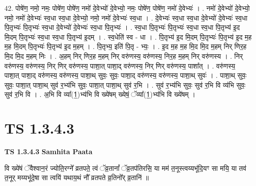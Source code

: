\documentclass[17pt]{extarticle}
\begin{document}
42. पोषे॑ण॒ नमो॒ नमः॒ पोषे॑ण॒ पोषे॑ण॒ नमो॑ दे॒वेभ्यो॑ दे॒वेभ्यो॒ नमः॒ पोषे॑ण॒ पोषे॑ण॒ नमो॑ दे॒वेभ्यः॑ । . नमो॑ दे॒वेभ्यो॑ दे॒वेभ्यो॒ नमो॒ नमो॑ दे॒वेभ्यः॑ स्व॒धा स्व॒धा दे॒वेभ्यो॒ नमो॒ नमो॑ दे॒वेभ्यः॑ स्व॒धा । . दे॒वेभ्यः॑ स्व॒धा स्व॒धा दे॒वेभ्यो॑ दे॒वेभ्यः॑ स्व॒धा पि॒तृभ्यः॑ पि॒तृभ्यः॑ स्व॒धा दे॒वेभ्यो॑ दे॒वेभ्यः॑ स्व॒धा पि॒तृभ्यः॑ । . स्व॒धा पि॒तृभ्यः॑ पि॒तृभ्यः॑ स्व॒धा स्व॒धा पि॒तृभ्य॑ इ॒द मि॒दम् पि॒तृभ्यः॑ स्व॒धा स्व॒धा पि॒तृभ्य॑ इ॒दम् । . स्व॒धेति॑ स्व - धा । . पि॒तृभ्य॑ इ॒द मि॒दम् पि॒तृभ्यः॑ पि॒तृभ्य॑ इ॒द म॒ह म॒ह मि॒दम् पि॒तृभ्यः॑ पि॒तृभ्य॑ इ॒द म॒हम् । . पि॒तृभ्य॒ इति॑ पि॒तृ - भ्यः॒ । . इ॒द म॒ह म॒ह मि॒द मि॒द म॒हम् निर् णिर॒ह मि॒द मि॒द म॒हम् निः । . अ॒हम् निर् णिर॒ह म॒हम् निर् वरु॑णस्य॒ वरु॑णस्य॒ निर॒ह म॒हम् निर् वरु॑णस्य । . निर् वरु॑णस्य॒ वरु॑णस्य॒ निर् णिर् वरु॑णस्य॒ पाशा॒त् पाशा॒द् वरु॑णस्य॒ निर् णिर् वरु॑णस्य॒ पाशा᳚त् । . वरु॑णस्य॒ पाशा॒त् पाशा॒द् वरु॑णस्य॒ वरु॑णस्य॒ पाशा॒थ् सुवः॒ सुवः॒ पाशा॒द् वरु॑णस्य॒ वरु॑णस्य॒ पाशा॒थ् सुवः॑ । . पाशा॒थ् सुवः॒ सुवः॒ पाशा॒त् पाशा॒थ् सुव॑ र॒भ्य॑भि सुवः॒ पाशा॒त् पाशा॒थ् सुव॑ र॒भि । . सुव॑ र॒भ्य॑भि सुवः॒ सुव॑ र॒भि वि व्य॑भि सुवः॒ सुव॑ र॒भि वि । . अ॒भि वि व्या᳚(1॒)भ्य॑भि वि ख्ये॑षम् ख्येषं॒ ॅव्या᳚(1॒)भ्य॑भि वि ख्ये॑षम् । \newline
\pagebreak
{}

\section{ TS 1.3.4.3 }

\textbf{TS 1.3.4.3 } \newline
\textbf{Samhita Paata} \newline

वि ख्ये॑षं ॅवैश्वान॒रं ज्योति॒रग्ने᳚ व्रतपते॒ त्वं ॅव्र॒तानां᳚ ॅव्र॒तप॑तिरसि॒ या मम॑ त॒नूस्त्वय्यभू॑दि॒यꣳ सा मयि॒ या तव॑ त॒नूर् मय्यभू॑दे॒षा सा त्वयि॑ यथाय॒थं नौ᳚ व्रतपते व्र॒तिनो᳚र् व्र॒तानि॑ ॥ \newline
\end{document}
